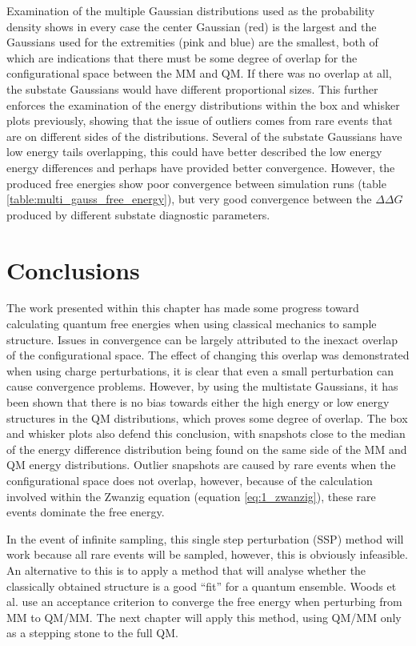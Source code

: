 Examination of the multiple Gaussian distributions used as the probability density shows in every case the center Gaussian (red) is the largest and the Gaussians used for the extremities (pink and blue) are the smallest, both of which are indications that there must be some degree of overlap for the configurational space between the MM and QM.  If there was no overlap at all, the substate Gaussians would have different proportional sizes.  This further enforces the examination of the energy distributions within the box and whisker plots previously, showing that the issue of outliers comes from rare events that are on different sides of the distributions.  Several of the substate Gaussians have low energy tails overlapping, this could have better described the low energy energy differences and perhaps have provided better convergence.  However, the produced free energies show poor convergence between simulation runs (table \ref{table:multi_gauss_free_energy}), but very good convergence between the $\Delta \Delta G$ produced by different substate diagnostic parameters.


\section{Conclusions}

The work presented within this chapter has made some progress toward calculating quantum free energies when using classical mechanics to sample structure.  Issues in convergence can be largely attributed to the inexact overlap of the configurational space.  The effect of changing this overlap was demonstrated when using charge perturbations, it is clear that even a small perturbation can cause convergence problems.  However, by using the multistate Gaussians, it has been shown that there is no bias towards either the high energy or low energy structures in the QM distributions, which proves some degree of overlap.  The box and whisker plots also defend this conclusion, with snapshots close to the median of the energy difference distribution being found on the same side of the MM and QM energy distributions.  Outlier snapshots are caused by rare events when the configurational space does not overlap, however, because of the calculation involved within the Zwanzig equation (equation \ref{eq:1_zwanzig}), these rare events dominate the free energy.

In the event of infinite sampling, this single step perturbation (SSP) method will work because all rare events will be sampled, however, this is obviously infeasible.  An alternative to this is to apply a method that will analyse whether the classically obtained structure is a good ``fit'' for a quantum ensemble.  Woods et al. \cite{mullholland_qmmm} use an acceptance criterion to converge the free energy when perturbing from MM to QM/MM.  The next chapter will apply this method, using QM/MM only as a stepping stone to the full QM.







